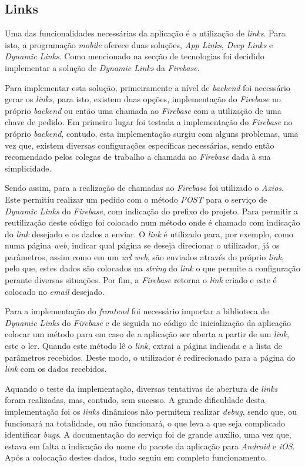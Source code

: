 \subsection{Links}
Uma das funcionalidades necessárias da aplicação é a utilização de \textit{links}. Para isto, a programação \textit{mobile} oferece duas soluções, \textit{App Links}, \textit{Deep Links} e \textit{Dynamic Links}. Como mencionado na secção de tecnologias foi decidido implementar a solução de \textit{Dynamic Links} da \textit{Firebase}.

Para implementar esta solução, primeiramente a nível de \textit{backend} foi necessário gerar os \textit{links}, para isto, existem duas opções, implementação do \textit{Firebase} no próprio \textit{backend} ou então uma chamada ao \textit{Firebase} com a utilização de uma chave de pedido. Em primeiro lugar foi testada a implementação do \textit{Firebase} no próprio \textit{backend}, contudo, esta implementação surgiu com alguns problemas, uma vez que, existem diversas configurações específicas necessárias, sendo então recomendado pelos colegas de trabalho a chamada ao \textit{Firebase} dada à sua simplicidade.

Sendo assim, para a realização de chamadas ao \textit{Firebase} foi utilizado o \textit{Axios}. Este permitiu realizar um pedido com o método \textit{POST} para o serviço de \textit{Dynamic Links} do \textit{Firebase}, com indicação do prefixo do projeto. Para permitir a reutilização deste código foi colocado num método onde é chamado com indicação do \textit{link} desejado e os dados a enviar. O \textit{link} é utilizado para, por exemplo, como numa página \textit{web}, indicar qual página se deseja direcionar o utilizador, já os parâmetros, assim como em um \textit{url web}, são enviados através do próprio \textit{link}, pelo que, estes dados são colocados na \textit{string} do \textit{link} o que permite a configuração perante diversas situações. Por fim, a \textit{Firebase} retorna o \textit{link} criado e este é colocado no \textit{email} desejado.

Para a implementação do \textit{frontend} foi necessário importar a biblioteca de \textit{Dynamic Links} do \textit{Firebase} e de seguida no código de inicialização da aplicação colocar um método para em caso de a aplicação ser aberta a partir de um \textit{link}, este o ler. Quando este método lê o \textit{link}, extrai a página indicada e a lista de parâmetros recebidos. Deste modo, o utilizador é redirecionado para a página do \textit{link} com os dados recebidos.

Aquando o teste da implementação, diversas tentativas de abertura de \textit{links} foram realizadas, mas, contudo, sem sucesso. A grande dificuldade desta implementação foi os \textit{links} dinâmicos não permitem realizar \textit{debug}, sendo que, ou funcionará na totalidade, ou não funcionará, o que leva a que seja complicado identificar \textit{bugs}. A documentação do serviço foi de grande auxílio, uma vez que, estava em falta a indicação do nome do pacote da aplicação para \textit{Android} e \textit{iOS}. Após a colocação destes dados, tudo seguiu em completo funcionamento.